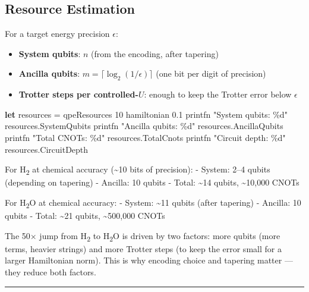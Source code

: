 \documentclass[
  11pt,
  oneside]{book}
\newenvironment{Shaded}{\begin{snugshade}}{\end{snugshade}}
\newcommand{\DecValTok}[1]{\textcolor[rgb]{0.00,0.00,0.81}{#1}}
\newcommand{\FloatTok}[1]{\textcolor[rgb]{0.00,0.00,0.81}{#1}}
\newcommand{\KeywordTok}[1]{\textcolor[rgb]{0.13,0.29,0.53}{\textbf{#1}}}
\newcommand{\NormalTok}[1]{#1}
\newcommand{\StringTok}[1]{\textcolor[rgb]{0.31,0.60,0.02}{#1}}
\providecommand{\tightlist}{%
  \setlength{\itemsep}{0pt}\setlength{\parskip}{0pt}}
\begin{document}
\subsection{Resource Estimation}\label{resource-estimation}

For a target energy precision \(\epsilon\):

\begin{itemize}
\tightlist
\item
  \textbf{System qubits}: \(n\) (from the encoding, after tapering)
\item
  \textbf{Ancilla qubits}: \(m = \lceil\log_2(1/\epsilon)\rceil\) (one
  bit per digit of precision)
\item
  \textbf{Trotter steps per controlled-\(U\)}: enough to keep the
  Trotter error below \(\epsilon\)
\end{itemize}

\begin{Shaded}
\begin{Highlighting}[]
\KeywordTok{let}\NormalTok{ resources = qpeResources }\DecValTok{10}\NormalTok{ hamiltonian }\FloatTok{0.1}
\NormalTok{printfn }\StringTok{"System qubits:  \%d"}\NormalTok{ resources.SystemQubits}
\NormalTok{printfn }\StringTok{"Ancilla qubits: \%d"}\NormalTok{ resources.AncillaQubits}
\NormalTok{printfn }\StringTok{"Total CNOTs:    \%d"}\NormalTok{ resources.TotalCnots}
\NormalTok{printfn }\StringTok{"Circuit depth:  \%d"}\NormalTok{ resources.CircuitDepth}
\end{Highlighting}
\end{Shaded}

For H\textsubscript{2} at chemical accuracy (\textasciitilde10 bits of precision): -
System: 2--4 qubits (depending on tapering) - Ancilla: 10 qubits -
Total: \textasciitilde14 qubits, \textasciitilde10,000 CNOTs

For H\textsubscript{2}O at chemical accuracy: - System: \textasciitilde11 qubits (after
tapering) - Ancilla: 10 qubits - Total: \textasciitilde21 qubits,
\textasciitilde500,000 CNOTs

The 50$\times$ jump from H\textsubscript{2} to H\textsubscript{2}O is driven by two factors: more qubits (more
terms, heavier strings) and more Trotter steps (to keep the error small
for a larger Hamiltonian norm). This is why encoding choice and tapering
matter --- they reduce both factors.

\begin{center}\rule{0.5\linewidth}{0.5pt}\end{center}
\end{document}
